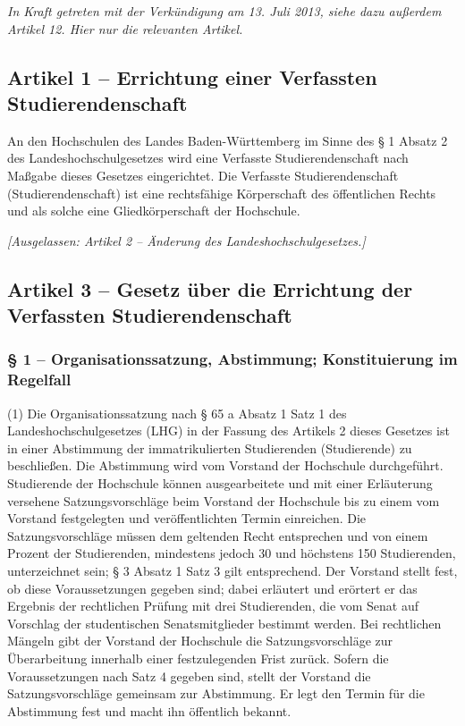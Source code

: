 \documentclass[
10pt,
a4paper,
twoside,								%
titlepage=false,							%
draft=false								%
]{scrartcl}
\begin{document}
\emph{In Kraft getreten mit der Verkündigung am 13. Juli 2013, siehe dazu außerdem Artikel 12. Hier nur die relevanten Artikel.}

\subsection{Artikel 1 – Errichtung einer Verfassten Studierendenschaft}

An den Hochschulen des Landes Baden-Württemberg im Sinne des § 1 Absatz 2 des Landeshochschulgesetzes wird eine Verfasste Studierendenschaft 
nach Maßgabe dieses Gesetzes eingerichtet. Die Verfasste Studierendenschaft (Studierendenschaft) ist eine rechtsfähige Körperschaft des öffentlichen Rechts und als solche eine Gliedkörperschaft der Hochschule.

\bigskip
\emph{[Ausgelassen: Artikel 2 – Änderung des Landeshochschulgesetzes.]}


\subsection{Artikel 3 – Gesetz über die Errichtung der Verfassten Studierendenschaft}

\subsubsection*{§ 1 – Organisationssatzung, Abstimmung; Konstituierung im Regelfall}

(1) Die Organisationssatzung nach § 65 a Absatz 1 Satz 1 des Landeshochschulgesetzes (LHG) in der Fassung des Artikels 2 dieses Gesetzes ist in einer Abstimmung der immatrikulierten Studierenden (Studierende) zu beschließen. Die Abstimmung wird vom Vorstand der Hochschule durchgeführt. Studierende der Hochschule können ausgearbeitete und mit einer Erläuterung versehene Satzungsvorschläge beim Vorstand der Hochschule bis zu einem vom Vorstand festgelegten und veröffentlichten Termin einreichen. Die Satzungsvorschläge müssen dem geltenden Recht entsprechen und von einem Prozent der Studierenden, mindestens jedoch 30 und höchstens 150 Studierenden, unterzeichnet sein; § 3 Absatz 1 Satz 3 gilt entsprechend. Der Vorstand stellt fest, ob diese Voraussetzungen gegeben sind; dabei erläutert und erörtert er das Ergebnis der rechtlichen Prüfung mit drei Studierenden, die vom Senat auf Vorschlag der studentischen Senatsmitglieder bestimmt werden. Bei rechtlichen Mängeln gibt der Vorstand der Hochschule die Satzungsvorschläge zur Überarbeitung innerhalb einer festzulegenden Frist zurück. Sofern die Voraussetzungen nach Satz 4 gegeben sind, stellt der Vorstand die Satzungsvorschläge gemeinsam zur Abstimmung. Er legt den Termin für die Abstimmung fest und macht ihn öffentlich bekannt.
\end{document}
